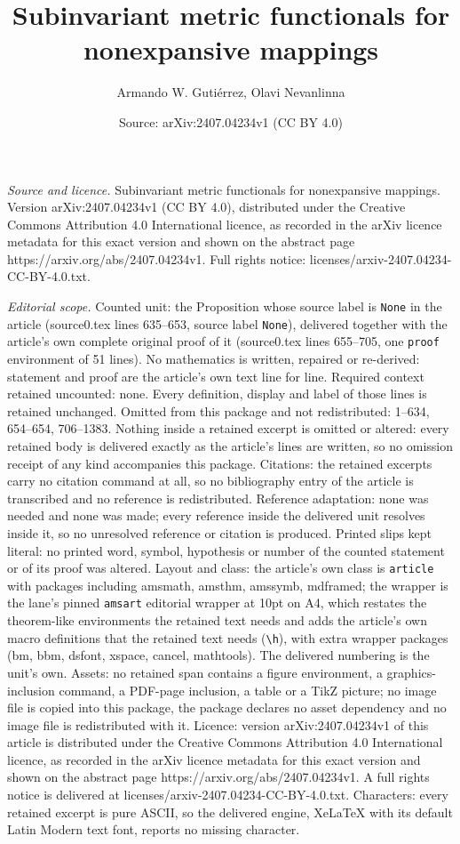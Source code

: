 \documentclass[10pt,a4paper]{amsart}
\title[Subinvariant metric functionals for nonexpansive mappings]{Subinvariant metric functionals for nonexpansive mappings}
\author{Armando W. Guti\'errez, Olavi Nevanlinna}
\date{Source: arXiv:2407.04234v1 (CC BY 4.0)}
\begin{document}
\maketitle

\noindent\emph{Source and licence.} Subinvariant metric functionals for nonexpansive mappings. Version arXiv:2407.04234v1 (CC BY 4.0), distributed under the Creative Commons Attribution 4.0 International licence, as recorded in the arXiv licence metadata for this exact version and shown on the abstract page https://arxiv.org/abs/2407.04234v1. Full rights notice: licenses/arxiv-2407.04234-CC-BY-4.0.txt.\par\smallskip

\noindent\textit{Editorial scope.} Counted unit: the Proposition whose source label is \texttt{None} in the article (source0.tex lines 635--653, source label \texttt{None}), delivered together with the article's own complete original proof of it (source0.tex lines 655--705, one \texttt{proof} environment of 51 lines). No mathematics is written, repaired or re-derived: statement and proof are the article's own text line for line. Required context retained uncounted: none. Every definition, display and label of those lines is retained unchanged. Omitted from this package and not redistributed: 1--634, 654--654, 706--1383. Nothing inside a retained excerpt is omitted or altered: every retained body is delivered exactly as the article's lines are written, so no omission receipt of any kind accompanies this package. Citations: the retained excerpts carry no citation command at all, so no bibliography entry of the article is transcribed and no reference is redistributed. Reference adaptation: none was needed and none was made; every reference inside the delivered unit resolves inside it, so no unresolved reference or citation is produced. Printed slips kept literal: no printed word, symbol, hypothesis or number of the counted statement or of its proof was altered. Layout and class: the article's own class is \texttt{article} with packages including amsmath, amsthm, amssymb, mdframed; the wrapper is the lane's pinned \texttt{amsart} editorial wrapper at 10pt on A4, which restates the theorem-like environments the retained text needs and adds the article's own macro definitions that the retained text needs (\texttt{\textbackslash h}), with extra wrapper packages (bm, bbm, dsfont, xspace, cancel, mathtools). The delivered numbering is the unit's own. Assets: no retained span contains a figure environment, a graphics-inclusion command, a PDF-page inclusion, a table or a TikZ picture; no image file is copied into this package, the package declares no asset dependency and no image file is redistributed with it. Licence: version arXiv:2407.04234v1 of this article is distributed under the Creative Commons Attribution 4.0 International licence, as recorded in the arXiv licence metadata for this exact version and shown on the abstract page https://arxiv.org/abs/2407.04234v1. A full rights notice is delivered at licenses/arxiv-2407.04234-CC-BY-4.0.txt. Characters: every retained excerpt is pure ASCII, so the delivered engine, XeLaTeX with its default Latin Modern text font, reports no missing character.
\end{document}
